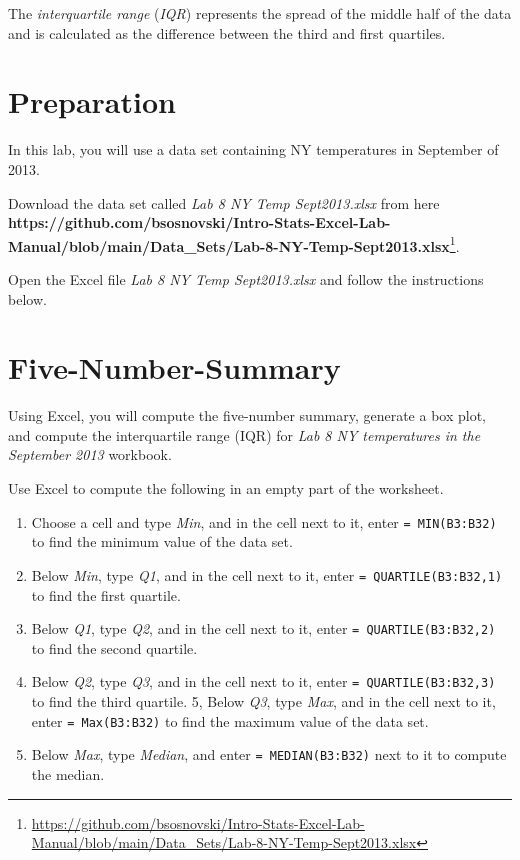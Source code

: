 \documentclass[
  12pt,
  letterpaper,
]{book}
\providecommand{\tightlist}{%
  \setlength{\itemsep}{0pt}\setlength{\parskip}{0pt}}
\DeclareRobustCommand{\href}[2]{#2\footnote{\url{#1}}}
\begin{document}
The \emph{interquartile range} (\emph{IQR}) represents the spread of the middle half of the data and is calculated as the difference between the third and first quartiles.

\hypertarget{preparation-5}{%
\section{Preparation}\label{preparation-5}}

In this lab, you will use a data set containing NY temperatures in September of 2013.

Download the data set called \emph{Lab 8 NY Temp Sept2013.xlsx} from here \href{https://github.com/bsosnovski/Intro-Stats-Excel-Lab-Manual/blob/main/Data_Sets/Lab-8-NY-Temp-Sept2013.xlsx}{\textbf{https://github.com/bsosnovski/Intro-Stats-Excel-Lab-Manual/blob/main/Data\_Sets/Lab-8-NY-Temp-Sept2013.xlsx}}.

Open the Excel file \emph{Lab 8 NY Temp Sept2013.xlsx} and follow the instructions below.

\hypertarget{five-number-summary}{%
\section{Five-Number-Summary}\label{five-number-summary}}

Using Excel, you will compute the five-number summary, generate a box plot, and compute the interquartile range (IQR) for \emph{Lab 8 NY temperatures in the September 2013} workbook.

Use Excel to compute the following in an empty part of the worksheet.

\begin{enumerate}
\def\labelenumi{\arabic{enumi}.}
\tightlist
\item
  Choose a cell and type \emph{Min}, and in the cell next to it, enter \texttt{=\ MIN(B3:B32)} to find the minimum value of the data set.
\item
  Below \emph{Min}, type \emph{Q1}, and in the cell next to it, enter \texttt{=\ QUARTILE(B3:B32,1)} to find the first quartile.
\item
  Below \emph{Q1}, type \emph{Q2}, and in the cell next to it, enter \texttt{=\ QUARTILE(B3:B32,2)} to find the second quartile.
\item
  Below \emph{Q2}, type \emph{Q3}, and in the cell next to it, enter \texttt{=\ QUARTILE(B3:B32,3)} to find the third quartile.
  5, Below \emph{Q3}, type \emph{Max}, and in the cell next to it, enter \texttt{=\ Max(B3:B32)} to find the maximum value of the data set.
\item
  Below \emph{Max}, type \emph{Median}, and enter \texttt{=\ MEDIAN(B3:B32)} next to it to compute the median.
\end{enumerate}
\end{document}
